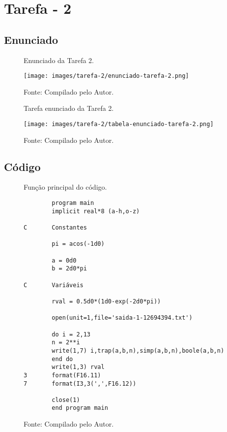 \chapter*{Tarefa - 2}

\section*{Enunciado}

\begin{figure}[h!]
\centering
\caption{Enunciado da Tarefa 2.}
\centering
\texttt{[image: images/tarefa-2/enunciado-tarefa-2.png]}
\caption*{Fonte: Compilado pelo Autor.}
\label{fig:tarefa 2 - Enunciado}
\end{figure}


\begin{figure}[h!]
\centering
\caption{Tarefa enunciado da Tarefa 2.}
\centering
\texttt{[image: images/tarefa-2/tabela-enunciado-tarefa-2.png]}
\caption*{Fonte: Compilado pelo Autor.}
\label{fig:tarefa 2 - Tabela Enunciado}
\end{figure}

\section*{Código}


\begin{figure}[H]
\centering
\caption{Função principal do código.}
\centering

\begin{lstlisting}
        program main
        implicit real*8 (a-h,o-z)

C       Constantes

        pi = acos(-1d0)

        a = 0d0
        b = 2d0*pi

C       Variáveis

        rval = 0.5d0*(1d0-exp(-2d0*pi))

        open(unit=1,file='saida-1-12694394.txt')

        do i = 2,13
        n = 2**i
        write(1,7) i,trap(a,b,n),simp(a,b,n),boole(a,b,n)
        end do
        write(1,3) rval
3       format(F16.11)
7       format(I3,3(',',F16.12))
        
        close(1)
        end program main
\end{lstlisting}

\caption*{Fonte: Compilado pelo Autor.}
\label{fig:tarefa 2 - função principal do código}
\end{figure}


